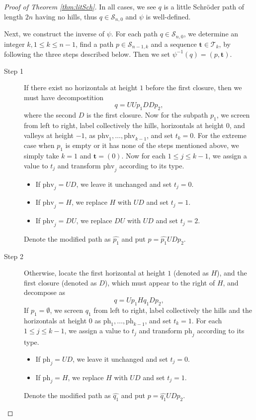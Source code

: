 \documentclass[11pt,reqno]{amsart}
\numberwithin{equation}{section}
\theoremstyle{plain}
\theoremstyle{definition}
\newcommand{\s}{\mathcal{S}}
\newcommand{\T}{\mathcal{T}}
\begin{document}
\begin{proof}[Proof of Theorem \ref{thm:litSch}]
In all cases, we see $q$ is a little Schr\"oder path of length $2n$ having no hills, thus $q\in\s_{n,0}$ and $\psi$ is well-defined.

Next, we construct the inverse of $\psi$. For each path $q\in\s_{n,0}$, we determine an integer $k, 1\le k\le n-1$, find a path $p\in\s_{n-1,k}$ and a sequence $\mathbf{t}\in\T_k$, by following the three steps described below. Then we set $\psi^{-1}(q)=(p,\mathbf{t})$.
\begin{description}
	\item[Step 1] If there exist no horizontals at height $1$ before the first closure, then we must have decompostition
	$$q=UUp_1DDp_2,$$ where the second $D$ is the first closure. Now for the subpath $p_1$, we screen from left to right, label collectively the hills, horizontals at height $0$, and valleys at height $-1$, as $\mathrm{phv}_1,\ldots,\mathrm{phv}_{k-1}$, and set $t_k=0$. For the extreme case when $p_1$ is empty or it has none of the steps mentioned above, we simply take $k=1$ and $\mathbf{t}=(0)$. Now for each $1\le j\le k-1$, we assign a value to $t_j$ and transform $\mathrm{phv}_j$ according to its type.
\begin{itemize}
\item If $\mathrm{phv}_j=UD$, we leave it unchanged and set $t_j=0$.
\item If $\mathrm{phv}_j=H$, we replace $H$ with $UD$ and set $t_j=1$.
\item If $\mathrm{phv}_j=DU$, we replace $DU$ with $UD$ and set $t_j=2$.
\end{itemize}
Denote the modified path as $\hat{p_1}$ and put $p=\hat{p_1}UDp_2$.
	\item[Step 2] Otherwise, locate the first horizontal at height $1$ (denoted as $H$), and the first closure (denoted as $D$), which must appear to the right of $H$, and decompose as
	$$q=Up_1Hq_1Dp_2,$$ If $p_1=\emptyset$, we screen $q_1$ from left to right, label collectively the hills and the horizontals at height $0$ as $\mathrm{ph}_1,\ldots,\mathrm{ph}_{k-1}$, and set $t_k=1$. For each $1\le j\le k-1$, we assign a value to $t_j$ and transform $\mathrm{ph}_j$ according to its type.
	\begin{itemize}
    \item If $\mathrm{ph}_j=UD$, we leave it unchanged and set $t_j=0$.
    \item If $\mathrm{ph}_j=H$, we replace $H$ with $UD$ and set $t_j=1$.
    \end{itemize}
    Denote the modified path as $\hat{q_1}$ and put $p=\hat{q_1}UDp_2$.

\end{description}
\end{proof}
\end{document}
